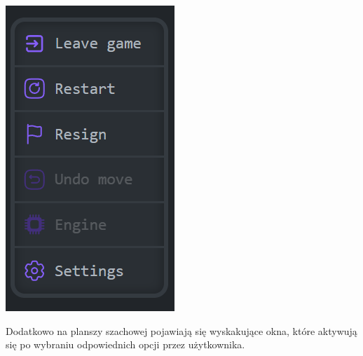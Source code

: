 \documentclass[twoside]{projektInzynierskiMS1}
\begin{document}
\begin{minipage}[t]{0.25\textwidth} 
    \vspace{0pt} 
    \centering 
    \includegraphics[width=\linewidth]{images/ins_min_eopt.png} 
\end{minipage}

\newpage

\noindent
Dodatkowo na planszy szachowej pojawiają się wyskakujące okna, które aktywują się po wybraniu odpowiednich opcji przez użytkownika.
\end{document}
